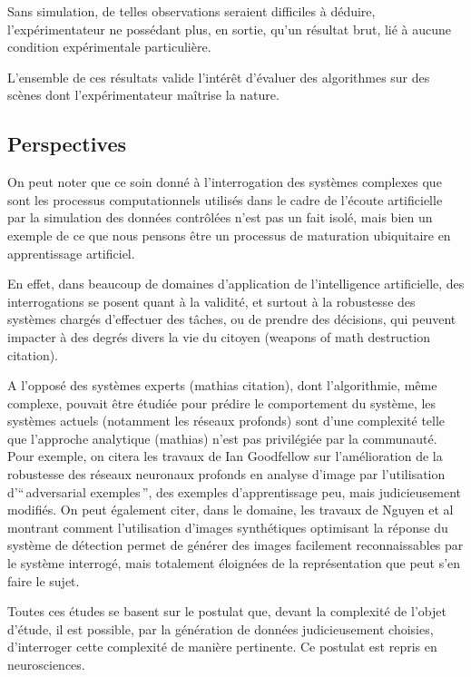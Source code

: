 Sans simulation, de telles observations seraient difficiles à déduire, l’expérimentateur ne possédant plus, en sortie, qu’un résultat brut, lié à aucune condition expérimentale particulière.

L'ensemble de ces résultats valide l'intérêt d'évaluer des algorithmes sur des scènes dont l'expérimentateur maîtrise la nature.

\subsection{Perspectives}

On peut noter que ce soin donné à l’interrogation des systèmes complexes que sont les processus computationnels utilisés dans le cadre de l’écoute artificielle par la simulation des données contrôlées n’est pas un fait isolé, mais bien un exemple de ce que nous pensons être un processus de maturation ubiquitaire en apprentissage artificiel.

En effet, dans beaucoup de domaines d’application de l’intelligence artificielle, des interrogations se posent quant à la validité, et surtout à la robustesse des systèmes chargés d’effectuer des tâches, ou de prendre des décisions, qui peuvent impacter à des degrés divers la vie du citoyen (weapons of math destruction citation).

A l’opposé des systèmes experts (mathias citation), dont l’algorithmie, même complexe, pouvait être étudiée pour prédire le comportement du système, les systèmes actuels (notamment les réseaux profonds) sont d’une complexité telle que l'approche analytique (mathias) n'est pas privilégiée par la communauté. Pour exemple, on citera les travaux de Ian Goodfellow sur l’amélioration de la robustesse des réseaux neuronaux profonds en analyse d’image par l'utilisation d'``\,adversarial exemples\,'', des exemples d’apprentissage peu, mais judicieusement modifiés. On peut également citer, dans le domaine, les travaux de Nguyen et al montrant comment l’utilisation d'images synthétiques optimisant la réponse du système de détection permet de générer des images facilement reconnaissables par le système interrogé, mais totalement éloignées de la représentation que peut s’en faire le sujet.

Toutes ces études se basent sur le postulat que, devant la complexité de l’objet d’étude, il est possible, par la génération de données judicieusement choisies, d'interroger cette complexité de manière pertinente. Ce postulat est repris en neurosciences.


